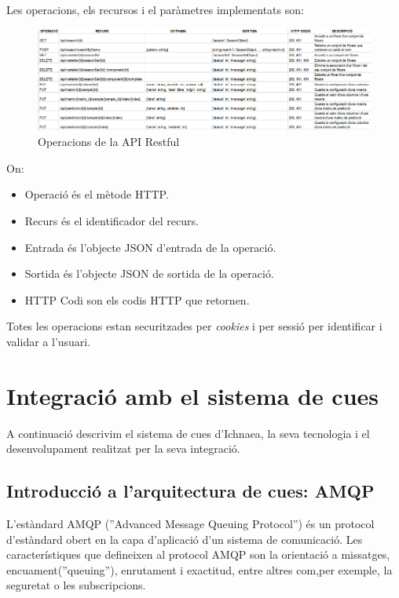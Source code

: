 Les operacions, els recursos i el paràmetres implementats son:\\
\begin{figure}[H]
  \includegraphics[scale=0.5]{img/implementation/apirestul.png}
  \caption{Operacions de la API Restful}
  \label{fig:apirestful}
\end{figure}
On:
\begin{itemize}
\item Operació \'{e}s el mètode HTTP.
\item Recurs \'{e}s el identificador del recurs.
\item Entrada \'{e}s l'objecte JSON d'entrada de la operació.
\item Sortida \'{e}s l'objecte JSON de sortida de la operació.
\item HTTP Codi son els codis HTTP que retornen.\cite{listhttpcodis}
\end{itemize}

Totes les operacions estan securitzades per \textit{cookies}\cite{cookies} i per sessió per identificar i validar a l'usuari.\cite{sessions}

\section{Integraci\'{o} amb el sistema de cues}
A continuació descrivim el sistema de cues d'Ichnaea, la seva tecnologia i el desenvolupament realitzat per la seva integració.\\

\subsection{Introducci\'{o} a l'arquitectura de cues: AMQP}
\label{sec:queue_system_overview}
L'est\`{a}ndard AMQP (''Advanced Message Queuing Protocol'') \'{e}s un protocol d'est\`{a}ndard obert en la capa d'aplicació d'un sistema de comunicació. Les característiques que defineixen al protocol AMQP son la orientació a missatges, encuament(''queuing''), enrutament i exactitud, entre altres com,per exemple, la seguretat o les subscripcions.\cite{amqp}\\

